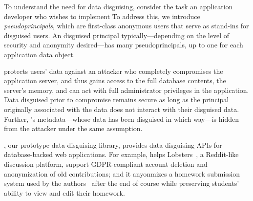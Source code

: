 %
To understand the need for data disguising, consider the task an application
developer who wishes to implement 
%
%
%
%
To address this, we introduce \emph{pseudoprincipals}, which are first-class anonymous
users that serve as stand-ins for disguised users.
%
An disguised principal typically---depending on the level of security and anonymity
desired---has many pseudoprincipals, up to one for each application data object.
%

%
\sys protects users' data against an attacker who completely compromises the
application server, and thus gains access to the full database contents, the server's
memory, and can act with full administrator privileges in the application.
%
Data disguised prior to compromise remains secure as long as the principal
originally associated with the data does not interact with their disguised
data.
%
Further, \sys's metadata---\eg whose data has been disguised in which way---is
hidden from the attacker under the same assumption.
%


%
\sys, our prototype data disguising library, provides data disguising APIs for
database-backed web applications.
%
For example, \sys helps Lobsters~\cite{lobsters}, a Reddit-like discussion platform,
support GDPR-compliant account deletion and anonymization of old contributions; and it
anyonmizes a homework submission system used by the authors~\cite{websubmit-rs-anon}
after the end of course while preserving students' ability to view and edit their
homework.
%


